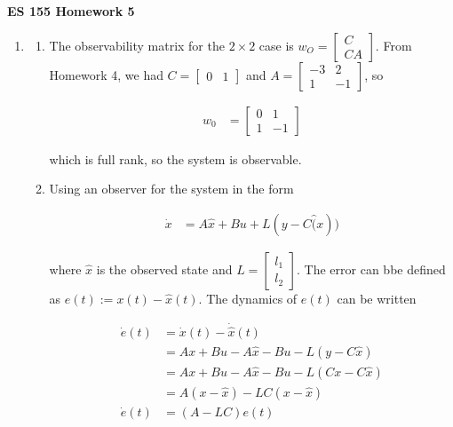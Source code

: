 \documentclass[11pt]{article}
\theoremstyle{definition}
\begin{document}
\textbf{\huge{ES 155 Homework 5}}    %
\normalsize

\begin{enumerate}
    \item %
    \begin{enumerate}
        \item %
        The observability matrix for the $2 \times 2$ case is $w_O = \begin{bmatrix} C \\ CA \end{bmatrix}$.  From Homework 4, we had $C = \begin{bmatrix} 0 & 1 \end{bmatrix}$ and $A = \begin{bmatrix} -3 & 2 \\ 1 & -1 \end{bmatrix}$, so
        
        \begin{align*}
            w_0 &= \begin{bmatrix} 0 & 1 \\ 1 & -1 \end{bmatrix}
        \end{align*}

        which is full rank, so the system is observable.

        \item %
        Using an observer for the system in the form

        \begin{align*}
            \dot{x} &= A\hat{x} + Bu + L(y - C\hat(x))
        \end{align*}

        where $\hat{x}$ is the observed state and $L = \begin{bmatrix} l_1 \\ l_2 \end{bmatrix}$.  The error can bbe defined as $e(t) := x(t) - \hat{x}(t)$.  The dynamics of $e(t)$ can be written

        \begin{align*}
            \dot{e}(t) &= \dot{x}(t) - \dot{\hat{x}}(t) \\
            &= Ax + Bu - A\hat{x} - Bu - L(y - C\hat{x}) \\
            &= Ax + Bu - A\hat{x} - Bu - L(Cx - C\hat{x}) \\
            &= A(x - \hat{x}) - LC(x - \hat{x}) \\
            \dot{e}(t) &= (A - LC) e(t)
        \end{align*}


\end{enumerate}
\end{enumerate}
\end{document}
